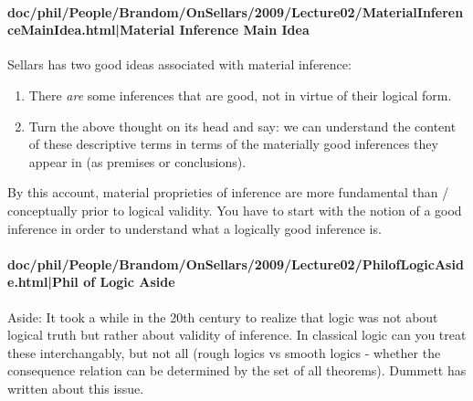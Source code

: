 \documentclass[12pt,a4paper]{report}
\begin{document}
\paragraph{doc/phil/People/Brandom/OnSellars/2009/Lecture02/MaterialInferenceMainIdea.html|Material Inference Main Idea}

Sellars has two good ideas associated with material inference:
\begin{enumerate}
\item There \emph{are} some inferences that are good, not in virtue of their logical form.
\item Turn the above thought on its head and say: we can understand the content of these descriptive terms in terms of the materially good inferences they appear in (as premises or conclusions).
\end{enumerate}


By this account, material proprieties of inference are more fundamental than / conceptually prior to logical validity. You have to start with the notion of a good inference in order to understand what a logically good inference is.

\paragraph{doc/phil/People/Brandom/OnSellars/2009/Lecture02/PhilofLogicAside.html|Phil of Logic Aside}

Aside: It took a while in the 20th century to realize that logic was not about
logical truth but rather about validity of inference. In classical logic can
you treat these interchangably, but not all (rough logics vs smooth logics -
whether the consequence relation can be determined by the set of all theorems).
Dummett has written about this issue.
\end{document}
